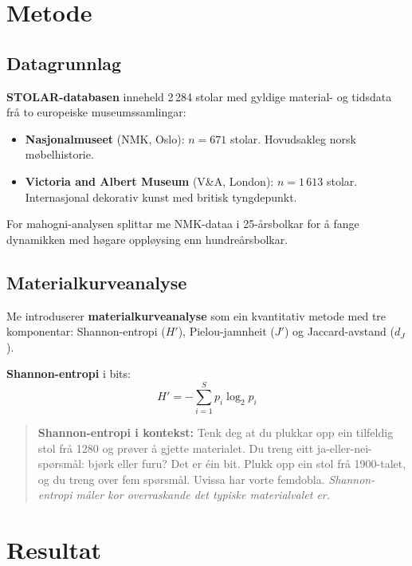 \documentclass[10pt, a4paper, twocolumn]{article}
\begin{document}
\section{Metode}

\subsection{Datagrunnlag}

\textbf{STOLAR-databasen} \citep{finne2026} inneheld 2\,284 stolar med gyldige material- og tidsdata frå to europeiske museumssamlingar:

\begin{itemize}
  \item \textbf{Nasjonalmuseet} (NMK, Oslo): $n = 671$ stolar. Hovudsakleg norsk møbelhistorie.
  \item \textbf{Victoria and Albert Museum} (V\&A, London): $n = 1\,613$ stolar. Internasjonal dekorativ kunst med britisk tyngdepunkt.
\end{itemize}

For mahogni-analysen splittar me NMK-dataa i 25-årsbolkar for å fange dynamikken med høgare oppløysing enn hundreårsbolkar.

\subsection{Materialkurveanalyse}

Me introduserer \textbf{materialkurveanalyse} som ein kvantitativ metode med tre komponentar: Shannon-entropi ($H'$), Pielou-jamnheit ($J'$) og Jaccard-avstand ($d_J$).

\textbf{Shannon-entropi} \citep{shannon1948} i bits:
\begin{equation}
  H' = -\sum_{i=1}^{S} p_i \log_2 p_i
\end{equation}

\begin{quote}
\textbf{Shannon-entropi i kontekst:} Tenk deg at du plukkar opp ein tilfeldig stol frå 1280 og prøver å gjette materialet. Du treng eitt ja-eller-nei-spørsmål: bjørk eller furu? Det er éin bit. Plukk opp ein stol frå 1900-talet, og du treng over fem spørsmål. Uvissa har vorte femdobla. \emph{Shannon-entropi måler kor overraskande det typiske materialvalet er.}
\end{quote}


\section{Resultat}
\end{document}
